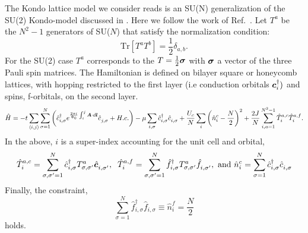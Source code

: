 

The Kondo lattice model we consider reads is an SU(N) generalization of the SU(2) Kondo-model   discussed in \cite{Capponi00,Assaad99a}.   Here we follow the work of  Ref.~\cite{Raczkowski20}. Let 
$T^{a}$ be the  $N^2 -1  $ generators of SU($N$)   that  satisfy the normalization condition: 
\begin{equation}
	\text{Tr}  \left[ T^{a} T^{b} \right]   = \frac{1}{2}\delta_{a,b}.
\label{Normalization_condition.eq}
\end{equation}
For the SU(2) case $T^{a}$  corresponds to the $T  = \frac{1}{2} \boldsymbol{\sigma}$ with $\boldsymbol{\sigma}$   a vector of the three Pauli spin matrices.      The   Hamiltonian is defined on bilayer  square or honeycomb lattices, with  hopping restricted to the  first layer  (i.e  conduction orbitals $\boldsymbol{c}^{\dagger}_{i}  )$   and  spins, f-orbitals, on the second layer. 
\begin{equation}
	\hat{H}     =   - t  \sum_{\langle i,j \rangle}    \sum_{\sigma=1}^{N}  \left(  \hat{c}^{\dagger}_{i,\sigma}  e^{\frac{2\pi i}{\Phi_0}  \int_{i}^{j} \ve{A}\cdot d \ve{l}}\hat{c}^{\phantom\dagger}_{j,\sigma}   + H.c.  \right)  - \mu \sum_{i,\sigma} \hat{c}^{\dagger}_{i,\sigma}  \hat{c}^{\phantom\dagger}_{i,\sigma} 
	+    \frac{U_c}{N}  \sum_{i}   \left( \hat{n}^c_i -  \frac{N}{2} \right)^2  
         +  \frac{2 J}{N} \sum_{i, a=1  }^{N^2 -1}  \hat{T}^{a,c}_{i}  \hat{T}^{a,f}_{i}. 
\label{Kondo_SUN_Ham.eq}
\end{equation}
In the above,  $i$ is a super-index  accounting for the unit cell and orbital,
\begin{equation}
	 \hat{T}^{a,c}_{i}   =   \sum_{\sigma,\sigma'=1}^{N} \hat{c}^{\dagger}_{i,\sigma}T^{a}_{\sigma,\sigma'}  \hat{\ve{c}}^{\phantom\dagger}_{i,\sigma'}, \; \; 
	  \hat{T}^{a,f}_{i}   = \sum_{\sigma,\sigma'=1}^{N} \hat{f}^{\dagger}_{i,\sigma} T^{a}_{\sigma,\sigma'}  \hat{f}^{\phantom\dagger}_{i,\sigma'},  
	  \text{   and  }   \hat{n}^c_i  = \sum_{\sigma=1}^{N} \hat{c}_{i,\sigma}^{\dagger} \hat{c}_{i,\sigma}^{\phantom\dagger} 
\end{equation}
Finally, the constraint, 
\begin{equation}
   \sum_{\sigma=1}^{N}  \hat{f}^{\dagger}_{i,\sigma}   \hat{f}^{\phantom\dagger}_{i,\sigma}  \equiv  \hat{n}^{f}_i = \frac{N}{2}
\end{equation}
holds.


